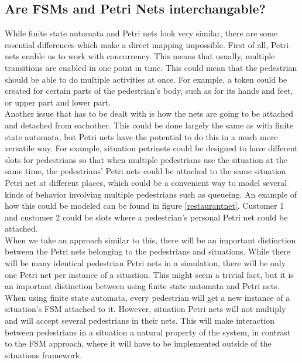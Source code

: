 \documentclass[11pt]{book}
\begin{document}
\subsection{Are FSMs and Petri Nets interchangable?}
While finite state automata and Petri nets look very similar, there are some essential differences which make a direct mapping impossible. First of all, Petri nets enable us to work with concurrency. This means that usually, multiple transitions are enabled in one point in time. This could mean that the pedestrian should be able to do multiple activities at once. For example, a token could be created for certain parts of the pedestrian's body, such as for its hands and feet, or upper part and lower part.\\
Another issue that has to be dealt with is how the nets are going to be attached and detached from eachother. This could be done largely the same as with finite state automata, but Petri nets have the potential to do this in a much more versatile way. For example, situation petrinets could be designed to have different slots for pedestrians so that when multiple pedestrians use the situation at the same time, the pedestrians' Petri nets could be attached to the same situation Petri net at different places, which could be a convenient way to model several kinds of behavior involving multiple pedestrians such as queueing. An example of how this could be modeled can be found in figure \ref{restaurantnet}.
Customer 1 and customer 2 could be slots where a pedestrian's personal Petri net could be attached. \\
When we take an approach similar to this, there will be an important distinction between the Petri nets belonging to the pedestrians and situations. While there will be many identical pedestrian Petri nets in a simulation, there will be only one Petri net per instance of a situation. This might seem a trivial fact, but it is an important distinction between using finite state automata and Petri nets. When using finite state automata, every pedestrian will get a new instance of a situation's FSM attached to it. However, situation Petri nets will not multiply and will accept several pedestrians in their nets. This will make interaction between pedestrians in a situation a natural property of the system, in contrast to the FSM approach, where it will have to be implemented outside of the situations framework.
\end{document}
